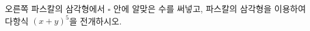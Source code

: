 \noindent\begin{minipage}[t]{0.58\linewidth}\vspace{0pt}\raggedright 오른쪽 파스칼의 삼각형에서 $\square$ 안에 알맞은 수를 써넣고, 파스칼의 삼각형을 이용하여 다항식 $(x+y)^5$을 전개하시오.\end{minipage}\hfill\begin{minipage}[t]{0.4\linewidth}\vspace{0pt}\centering \resizebox{\ifdim\width>\linewidth\linewidth\else\width\fi}{!}{}\end{minipage}\par
